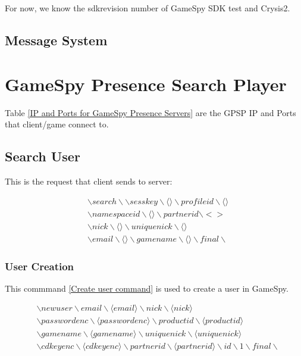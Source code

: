 \documentclass[oneside,titlepage,a4paper]{Definition/retrospy} %
\begin{document}
For now, we know the sdkrevision number of GameSpy SDK test and Crysis2.

\subsection{Message System}










\section{GameSpy Presence Search Player}
Table \ref{IP and Ports for GameSpy Presence Servers} are the GPSP IP and Ports that client/game connect to.

\subsection{Search User}
This is the request that client sends to server:
\begin{tcolorbox}
	\begin{equation}\label{Search User Request}
	\begin{split}
	&\backslash search\backslash\backslash sesskey \backslash \langle \rangle\backslash profileid \backslash \langle \rangle \\ &\backslash namespaceid\backslash \langle \rangle  \backslash partnerid\backslash <>\\
	& \backslash nick \backslash \langle \rangle \backslash uniquenick \backslash \langle \rangle \\ 
	&\backslash email \backslash \langle \rangle \backslash gamename \backslash \langle \rangle \backslash final \backslash
	\end{split}
	\end{equation}
\end{tcolorbox}

\subsubsection{User Creation}
This commmand \ref{Create user command} is used to create a user in GameSpy.
\begin{tcolorbox}
	\begin{equation}\label{Create user command}
	\begin{split}
	&\backslash newuser \backslash email \backslash \langle email \rangle \backslash nick \backslash \langle nick \rangle \\
	& \backslash passwordenc \backslash \langle passwordenc \rangle 
	\backslash productid \backslash \langle productid \rangle \\
	& \backslash gamename \backslash \langle gamename \rangle \backslash uniquenick \backslash \langle uniquenick \rangle \\
	& \backslash cdkeyenc \backslash \langle cdkeyenc \rangle \backslash partnerid \backslash \langle partnerid \rangle \backslash id \backslash 1 \backslash final \backslash
	\end{split}	
	\end{equation}
\end{tcolorbox}
\end{document}
